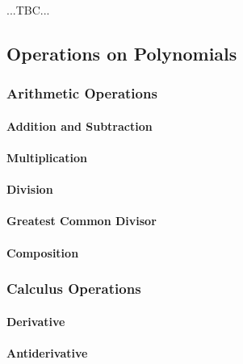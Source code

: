 ...TBC...

\subsection{Operations on Polynomials}

\subsubsection{Arithmetic Operations}

\paragraph{Addition and Subtraction}

\paragraph{Multiplication}

\paragraph{Division}

\paragraph{Greatest Common Divisor}


\paragraph{Composition}

\subsubsection{Calculus Operations}

\paragraph{Derivative}

\paragraph{Antiderivative}

